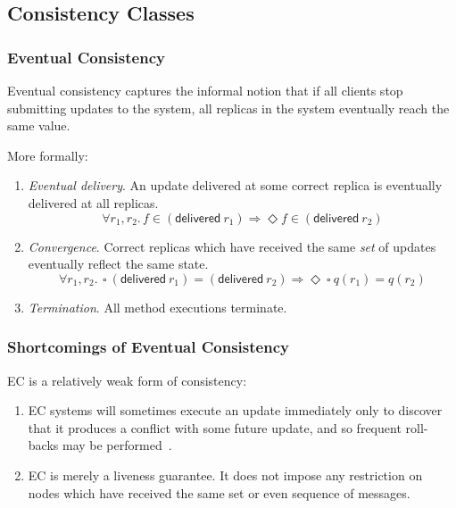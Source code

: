 \documentclass[aspectratio=169,compress,handout]{beamer}
\newcommand*{\EC}{\textsf{EC}\xspace}
\begin{document}
  \subsection{Consistency Classes}
  \begin{frame}
    \frametitle{Eventual Consistency}
    Eventual consistency captures the informal notion that if all clients stop
    submitting updates to the system, all replicas in the system eventually
    reach the same value.

    \pause

    More formally:
    \begin{definition}
      \begin{enumerate}[<+->]
        \item \emph{Eventual delivery}. An update delivered at some correct
          replica is eventually delivered at all replicas.
          \[
            \forall r_1, r_2.\, f \in (\textsf{delivered}~r_1) \Rightarrow
              \Diamond f \in (\textsf{delivered}~r_2)
          \]
        \item \emph{Convergence}. Correct replicas which have received the same
          \emph{set} of updates eventually reflect the same state.
          \[
            \forall r_1, r_2.\,~\square~(\textsf{delivered}~r_1) =
            (\textsf{delivered}~r_2) \Rightarrow \Diamond~\square~q(r_1) =
            q(r_2)
          \]
        \item \emph{Termination}. All method executions terminate.
      \end{enumerate}
    \end{definition}
  \end{frame}

  \begin{frame}
    \frametitle{Shortcomings of Eventual Consistency}

    \EC is a relatively weak form of consistency:

    \begin{enumerate}[<+->]
      \item \EC systems will sometimes execute an update immediately only to
        discover that it produces a conflict with some future update, and so
        frequent roll-backs may be performed~\citep{shapiro11}.
      \item \EC is merely a liveness guarantee. It does not impose any
        restriction on nodes which have received the same set or even sequence
        of messages.
    \end{enumerate}
  \end{frame}
\end{document}
